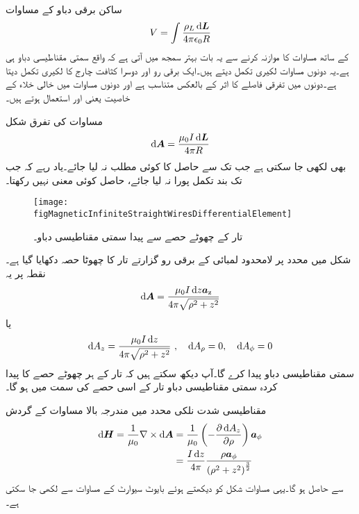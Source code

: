 ساکن برقی دباو کے مساوات
\begin{align*}
V=\int \frac{\rho_L \dif \kvec{L}}{4\pi \epsilon_0 R}
\end{align*}
کے ساتھ مساوات کا موازنہ کرنے سے یہ بات بہتر سمجھ میں آتی ہے کہ  واقع سمتی مقناطیسی دباو ہی ہے۔یہ دونوں مساوات لکیری تکمل دیتے ہیں۔ایک برقی رو اور دوسرا کثافت چارج کا لکیری تکمل دیتا ہے۔دونوں میں تفرقی فاصلے  کا اثر  کے بالعکس متناسب ہے اور دونوں مساوات میں خالی خلاء کے خاصیت یعنی  اور  استعمال ہوتے ہیں۔

مساوات  کی تفرق شکل
\begin{align}\label{مساوات_مقناطیسی_سمتی_دباو_تفرق_شکل}
\dif \kvec{A}=\frac{\mu_0 I \dif \kvec{L}}{4\pi R}
\end{align}
بھی لکھی جا سکتی ہے جب تک  سے حاصل  کا کوئی مطلب نہ لیا جائے۔یاد رہے کہ جب تک بند تکمل پورا نہ لیا جائے، حاصل  کوئی معنی نہیں رکھتا۔
\begin{figure}
\centering
\texttt{[image: figMagneticInfiniteStraightWiresDifferentialElement]}
\caption{تار کے چھوٹے حصے سے پیدا سمتی مقناطیسی دباو۔}
\label{شکل_مقناطیسی_سمتی_مقناطیسی_دباو_تفرق_حصہ}
\end{figure}

شکل  میں  محدد پر لامحدود لمبائی کے برقی رو گزارتے تار کا چھوٹا حصہ  دکھایا گیا ہے۔نقطہ  پر یہ
\begin{align*}
\dif \kvec{A}=\frac{\mu_0 I \dif z \az}{4\pi \sqrt{\rho^2+z^2}}
\end{align*}
یا
\begin{align}
\dif  A_z=\frac{\mu_0 I \dif z}{4\pi \sqrt{\rho^2+z^2}} \,\, , \quad \dif A_\rho=0, \quad \dif A_\phi=0
\end{align}
سمتی مقناطیسی دباو پیدا کرے گا۔آپ دیکھ سکتے ہیں کہ تار کے ہر چھوٹے حصے کا پیدا کردہ سمتی مقناطیسی دباو تار کے اسی حصے کی سمت میں ہو گا۔

مقناطیسی شدت  نلکی محدد میں مندرجہ بالا مساوات کے گردش
\begin{align*}
\dif \kvec{H}=\frac{1}{\mu_0} \nabla \times \dif \kvec{A}&=\frac{1}{\mu_0} \left(-\frac{\partial \dif A_z}{\partial \rho} \right)\aphi\\
&=\frac{I \dif z}{4\pi} \frac{\rho \aphi}{\left(\rho^2+z^2 \right)^{\frac{3}{2}}}
\end{align*}
 سے حاصل ہو گا۔یہی مساوات شکل  کو دیکھتے ہوئے بایوٹ سیوارٹ کے مساوات سے لکھی جا سکتی ہے۔

